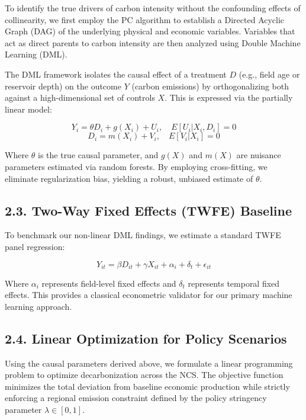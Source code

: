 \documentclass[
  11pt,
]{article}
\begin{document}
To identify the true drivers of carbon intensity without the confounding
effects of collinearity, we first employ the PC algorithm to establish a
Directed Acyclic Graph (DAG) of the underlying physical and economic
variables. Variables that act as direct parents to carbon intensity are
then analyzed using Double Machine Learning (DML).

The DML framework isolates the causal effect of a treatment \(D\) (e.g.,
field age or reservoir depth) on the outcome \(Y\) (carbon emissions) by
orthogonalizing both against a high-dimensional set of controls \(X\).
This is expressed via the partially linear model:

\[ Y_i = \theta D_i + g(X_i) + U_i, \quad E[U_i | X_i, D_i] = 0 \]
\[ D_i = m(X_i) + V_i, \quad E[V_i | X_i] = 0 \]

Where \(\theta\) is the true causal parameter, and \(g(X)\) and \(m(X)\)
are nuisance parameters estimated via random forests. By employing
cross-fitting, we eliminate regularization bias, yielding a robust,
unbiased estimate of \(\theta\).

\subsection{2.3. Two-Way Fixed Effects (TWFE)
Baseline}\label{two-way-fixed-effects-twfe-baseline}

To benchmark our non-linear DML findings, we estimate a standard TWFE
panel regression:

\[ Y_{it} = \beta D_{it} + \gamma X_{it} + \alpha_i + \delta_t + \epsilon_{it} \]

Where \(\alpha_i\) represents field-level fixed effects and \(\delta_t\)
represents temporal fixed effects. This provides a classical econometric
validator for our primary machine learning approach.

\subsection{2.4. Linear Optimization for Policy
Scenarios}\label{linear-optimization-for-policy-scenarios}

Using the causal parameters derived above, we formulate a linear
programming problem to optimize decarbonization across the NCS. The
objective function minimizes the total deviation from baseline economic
production while strictly enforcing a regional emission constraint
defined by the policy stringency parameter \(\lambda \in [0, 1]\).
\end{document}
